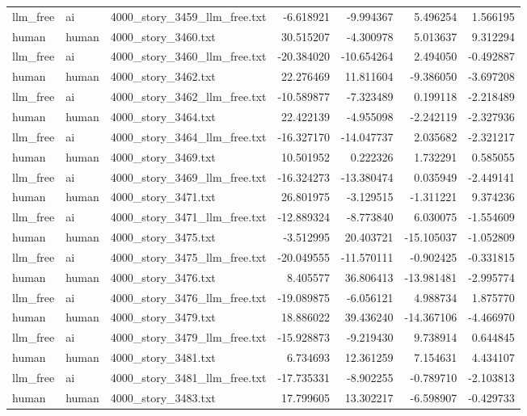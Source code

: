 \begin{longtable}{lllrrrr}
llm\_free & ai & 4000\_story\_3459\_llm\_free.txt & -6.618921 & -9.994367 & 5.496254 & 1.566195 \\
human & human & 4000\_story\_3460.txt & 30.515207 & -4.300978 & 5.013637 & 9.312294 \\
llm\_free & ai & 4000\_story\_3460\_llm\_free.txt & -20.384020 & -10.654264 & 2.494050 & -0.492887 \\
human & human & 4000\_story\_3462.txt & 22.276469 & 11.811604 & -9.386050 & -3.697208 \\
llm\_free & ai & 4000\_story\_3462\_llm\_free.txt & -10.589877 & -7.323489 & 0.199118 & -2.218489 \\
human & human & 4000\_story\_3464.txt & 22.422139 & -4.955098 & -2.242119 & -2.327936 \\
llm\_free & ai & 4000\_story\_3464\_llm\_free.txt & -16.327170 & -14.047737 & 2.035682 & -2.321217 \\
human & human & 4000\_story\_3469.txt & 10.501952 & 0.222326 & 1.732291 & 0.585055 \\
llm\_free & ai & 4000\_story\_3469\_llm\_free.txt & -16.324273 & -13.380474 & 0.035949 & -2.449141 \\
human & human & 4000\_story\_3471.txt & 26.801975 & -3.129515 & -1.311221 & 9.374236 \\
llm\_free & ai & 4000\_story\_3471\_llm\_free.txt & -12.889324 & -8.773840 & 6.030075 & -1.554609 \\
human & human & 4000\_story\_3475.txt & -3.512995 & 20.403721 & -15.105037 & -1.052809 \\
llm\_free & ai & 4000\_story\_3475\_llm\_free.txt & -20.049555 & -11.570111 & -0.902425 & -0.331815 \\
human & human & 4000\_story\_3476.txt & 8.405577 & 36.806413 & -13.981481 & -2.995774 \\
llm\_free & ai & 4000\_story\_3476\_llm\_free.txt & -19.089875 & -6.056121 & 4.988734 & 1.875770 \\
human & human & 4000\_story\_3479.txt & 18.886022 & 39.436240 & -14.367106 & -4.466970 \\
llm\_free & ai & 4000\_story\_3479\_llm\_free.txt & -15.928873 & -9.219430 & 9.738914 & 0.644845 \\
human & human & 4000\_story\_3481.txt & 6.734693 & 12.361259 & 7.154631 & 4.434107 \\
llm\_free & ai & 4000\_story\_3481\_llm\_free.txt & -17.735331 & -8.902255 & -0.789710 & -2.103813 \\
human & human & 4000\_story\_3483.txt & 17.799605 & 13.302217 & -6.598907 & -0.429733 \\

\end{longtable}
